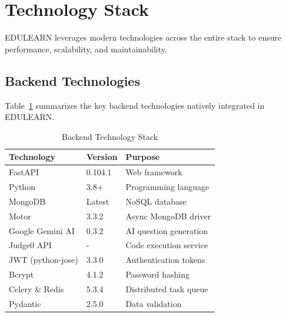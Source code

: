\documentclass[conference]{IEEEtran}
\begin{document}
\section{Technology Stack}

EDULEARN leverages modern technologies across the entire stack to ensure performance, scalability, and maintainability.

\subsection{Backend Technologies}
Table~\ref{tab:backend} summarizes the key backend technologies natively integrated in EDULEARN.

\begin{table}[ht]
    \centering
    \caption{Backend Technology Stack}
    \label{tab:backend}
    \begin{tabular}{@{}lll@{}}
        \toprule
        \textbf{Technology} & \textbf{Version} & \textbf{Purpose} \\
        \midrule
        FastAPI & 0.104.1 & Web framework \\
        Python & 3.8+ & Programming language \\
        MongoDB & Latest & NoSQL database \\
        Motor & 3.3.2 & Async MongoDB driver \\
        Google Gemini AI & 0.3.2 & AI question generation \\
        Judge0 API & - & Code execution service \\
        JWT (python-jose) & 3.3.0 & Authentication tokens \\
        Bcrypt & 4.1.2 & Password hashing \\
        Celery \& Redis & 5.3.4 & Distributed task queue \\
        Pydantic & 2.5.0 & Data validation \\
        \bottomrule
    \end{tabular}
\end{table}
\end{document}
